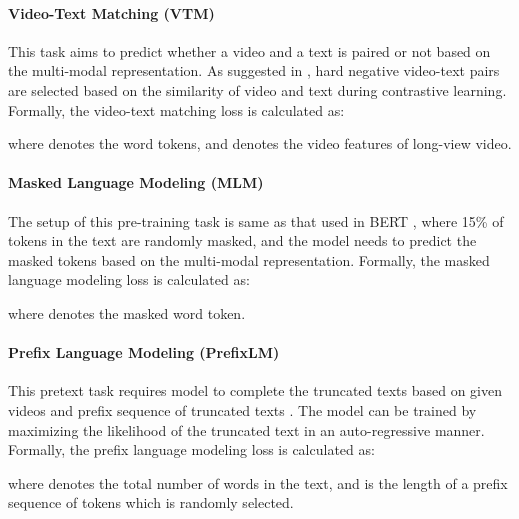 \documentclass[10pt,twocolumn,letterpaper]{article}
\begin{document}
\paragraph{Video-Text Matching (VTM)}
This task aims to predict whether a video and a text is paired or not based on the multi-modal representation. As suggested in \cite{li2021align, li2022alpro}, hard negative video-text pairs are selected based on the similarity of video and text during contrastive learning.
Formally, the video-text matching loss is calculated as:

where  denotes the word tokens, and  denotes the video features of long-view video.

\paragraph{Masked Language Modeling (MLM)}
The setup of this pre-training task is same as that used in BERT \cite{devlin2018bert}, where 15\% of tokens in the text are randomly masked, and the model needs to predict the masked tokens based on the multi-modal representation.
Formally, the masked language modeling loss is calculated as:

where  denotes the masked word token.

\paragraph{Prefix Language Modeling (PrefixLM)} This pretext task requires model to complete the truncated texts based on given videos and prefix sequence of truncated texts \cite{li2022mplug, li2022blip}. The model can be trained by maximizing the likelihood of the truncated text in an auto-regressive manner. 
Formally, the prefix language modeling loss is calculated as:

where  denotes the total number of words in the text, and  is the length of a prefix sequence of tokens which is randomly selected.
\end{document}
